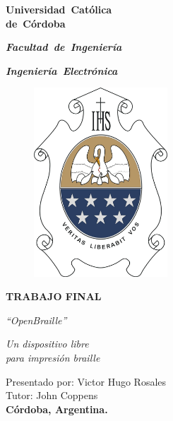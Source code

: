 
\sloppy
\newpage
\thispagestyle{empty}

\begin{center}
  \begin{Huge}
    {\bf \mbox{Universidad Cat\'olica}}\\
    {\bf \mbox{de C\'ordoba}}\\
  \end{Huge}
  \vspace*{0.8cm}

  \begin{huge}
    {\bf \it \mbox{Facultad de Ingenier\'ia}}\\
  \end{huge}
  \vspace*{0.8cm}

  \begin{LARGE}
    {\bf \it \mbox{Ingenier\'ia Electr\'onica}}\\
  \end{LARGE}
  \vspace*{0.8cm}
\end{center}


\begin{figure}[h]
  \centering
  \includegraphics[width=5cm]{./img/escudo_ucc.png}
\end{figure}
\vspace*{0.8cm}

\begin{center}
  \begin{LARGE}
    {\bf TRABAJO FINAL} \\
  \end{LARGE}
  \vspace*{0.5cm}

  \begin{LARGE}
    {\it ``OpenBraille''} \\
  \end{LARGE}
  
  \begin{Large}
    {\it Un dispositivo libre} \\
    {\it para impresi\'on braille} \\
  \end{Large}
\end{center}


\begin{center}
  \vspace*{1cm}
  Presentado por: Victor Hugo Rosales\\
  \vspace*{1cm}
  Tutor: John Coppens \\
  {\bf C\'ordoba, Argentina.}
\end{center}
